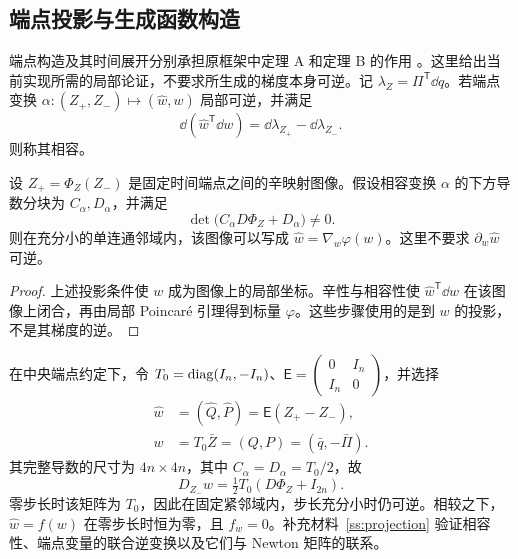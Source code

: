 \subsection{端点投影与生成函数构造}
\label{struct:endpoint-section}

端点构造及其时间展开分别承担原框架中定理 A 和定理 B 的作用 \citep{feng,fengqin}。这里给出当前实现所需的局部论证，不要求所生成的梯度本身可逆。记 $\lambda_Z=\Pi^{\mathsf T}\dd q$。若端点变换 $\alpha:(Z_+,Z_-)\mapsto(\widehat w,w)$ 局部可逆，并满足
\[
 \dd(\widehat w^{\mathsf T}\dd w)
      =\dd\lambda_{Z_+}-\dd\lambda_{Z_-}.
\]
则称其相容。

\begin{proposition}
\label{struct:endpoint-proposition}
设 $Z_+=\Phi_Z(Z_-)$ 是固定时间端点之间的辛映射图像。假设相容变换 $\alpha$ 的下方导数分块为 $C_\alpha,D_\alpha$，并满足
\[
 \det\bigl(C_\alpha D\Phi_Z+D_\alpha\bigr)\ne0.
\]
则在充分小的单连通邻域内，该图像可以写成 $\widehat w=\nabla_w\varphi(w)$。这里不要求 $\partial_w\widehat w$ 可逆。
\end{proposition}

\begin{proof}
上述投影条件使 $w$ 成为图像上的局部坐标。辛性与相容性使 $\widehat w^{\mathsf T}\dd w$ 在该图像上闭合，再由局部 Poincar\'e 引理得到标量 $\varphi$。这些步骤使用的是到 $w$ 的投影，不是其梯度的逆。
\end{proof}

在中央端点约定下，令 $T_0=\operatorname{diag}(I_n,-I_n)$、$\mathsf E=\left(\begin{smallmatrix}0&I_n\\I_n&0\end{smallmatrix}\right)$，并选择
\begin{equation}\label{struct:endpoint-variables}
\begin{aligned}
 \widehat w&=(\widehat Q,\widehat P)=\mathsf E(Z_+-Z_-),\\
 w&=T_0\bar Z=(Q,P)=(\bar q,-\bar\Pi).
\end{aligned}
\end{equation}
其完整导数的尺寸为 $4n\times4n$，其中 $C_\alpha=D_\alpha=T_0/2$，故
\begin{equation}\label{struct:endpoint-projection}
 D_{Z_-}w=\tfrac12T_0(D\Phi_Z+I_{2n}).
\end{equation}
零步长时该矩阵为 $T_0$，因此在固定紧邻域内，步长充分小时仍可逆。相较之下，$\widehat w=f(w)$ 在零步长时恒为零，且 $f_w=0$。补充材料~\ref{ss:projection} 验证相容性、端点变量的联合逆变换以及它们与 Newton 矩阵的联系。

